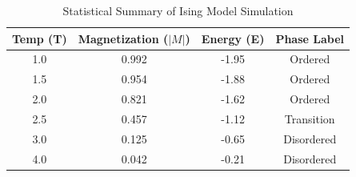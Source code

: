 \begin{table}[h]
    \centering
    \caption{Statistical Summary of Ising Model Simulation}
    \begin{tabular}{cccc}
        \toprule
        Temp (T) & Magnetization ($|M|$) & Energy (E) & Phase Label \\
        \midrule
        1.0 & 0.992 & -1.95 & Ordered \\
        1.5 & 0.954 & -1.88 & Ordered \\
        2.0 & 0.821 & -1.62 & Ordered \\
        2.5 & 0.457 & -1.12 & Transition \\
        3.0 & 0.125 & -0.65 & Disordered \\
        4.0 & 0.042 & -0.21 & Disordered \\
        \bottomrule
    \end{tabular}
\end{table}
